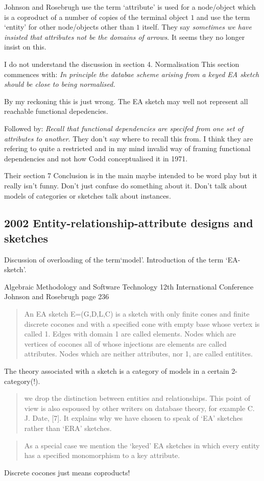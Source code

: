 \documentclass[10pt,a4paper]{scrartcl}
\newcommand{\displaybibentry}[1]
{\begin{framed}
\bibentry{#1}
\end{framed}
}
\begin{document}
Johnson and Rosebrugh use the term `attribute' is used for a node/object which is a coproduct of a number of copies of the terminal object $1$ and use the term `entity' for other node/objects other than $1$ itself.
They say  \textit{sometimes we have insisted that attributes not be the domains of arrows}. It seems they no longer insist on this. 

I do not understand the discussion in  section 4. Normalisation
This section commences with:
\textit{In principle the databae scheme arising from a keyed EA sketch should be close
to being normalised.}

By my reckoning this is just wrong. The EA sketch may well not represent all reachable functional depedencies.


Followed by: \textit{Recall that functional dependencies are specifed from one set of attributes to another}. They don't say where to recall this from. I think they are refering to quite a restricted and in my mind invalid way of framing functional dependencies and not how Codd conceptualised it in 1971.

Their section 7 Conclusion is in the main maybe intended to be word play but it really isn't funny. Don't just confuse do something about it. Don't talk about models of categories or sketches talk about instances.



\subsection{2002 Entity-relationship-attribute designs and
sketches }
\displaybibentry{Johnson2002ERA}
Discussion of overloading of the term`model'.
Introduction of the term `EA-sketch'. 


Algebraic Methodology and Software Technology 12th International Conference Johnson and Rosebrugh page 236
\begin{quote}
An EA sketch E=(G,D,L,C) is a sketch with only finite cones and finite discrete cocones and with a 
specified cone with empty base whose vertex is called 1. Edges with domain 1 are called elements. 
Nodes which are vertices of cocones all of whose injections are elements are called attributes. 
Nodes which are neither attributes, nor 1, are called entitites.
\end{quote}
The theory associated with a sketch is a category of models in a certain 2-category(!).
\begin{quote}
we drop the distinction between entities and relationships. This point of view is also
espoused by other writers on database theory, for example C. J. Date, [7]. It explains
why we have chosen to speak of `EA' sketches rather than `ERA' sketches.
\end{quote}
\begin{quote}
As a special case we mention the `keyed' EA sketches in which every entity has
a specified monomorphism to a key attribute.
\end{quote}
Discrete cocones just means coproducts!
\end{document}
